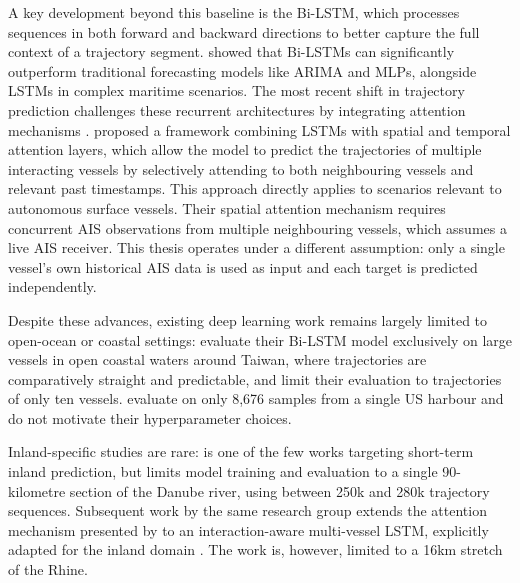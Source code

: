 A key development beyond this baseline is the \ac{Bi-LSTM}, which processes sequences in both forward and backward directions to better 
capture the full context of a trajectory segment. \textcite{articlebilstmsus} showed that \acp{Bi-LSTM} can significantly outperform 
traditional forecasting models like ARIMA and \acp{MLP}, alongside \acp{LSTM} in complex maritime scenarios.
The most recent shift in trajectory prediction challenges these recurrent architectures by 
integrating attention mechanisms \parencite{Zhang22}. \textcite{sekhon2020} proposed 
a framework combining \acp{LSTM} with spatial and temporal attention layers, which allow the 
model to predict the trajectories of multiple interacting vessels by selectively attending to 
both neighbouring vessels and relevant past timestamps. This 
approach directly applies to scenarios relevant to autonomous 
surface vessels. Their spatial attention mechanism requires concurrent AIS observations from multiple neighbouring vessels, which assumes a live AIS receiver. This thesis operates under a different assumption: only a single vessel's own historical AIS data is used as input and each target is predicted independently.

Despite these advances, existing deep learning work remains largely limited to open-ocean or coastal settings: 
\textcite{articlebilstmsus} evaluate their \ac{Bi-LSTM} model 
exclusively on large vessels in open coastal waters around Taiwan, where trajectories are 
comparatively straight and predictable, and limit their evaluation to trajectories of only ten vessels. \textcite{sekhon2020} evaluate on only 8,676 samples from a 
single US harbour and do not motivate their hyperparameter choices. 

Inland-specific studies are 
rare: \textcite{donandt2022shortterm} is one of the few %
works targeting short-term inland prediction, but limits model training and evaluation to a 
single 90-kilometre section of the Danube river, using between 250k and 280k trajectory 
sequences.
Subsequent work by the same research group extends the attention mechanism presented by \textcite{sekhon2020} to an interaction-aware multi-vessel LSTM, explicitly adapted for the inland domain \parencite{legel2025}. The work is, however, limited to a 16km stretch of the Rhine. %

